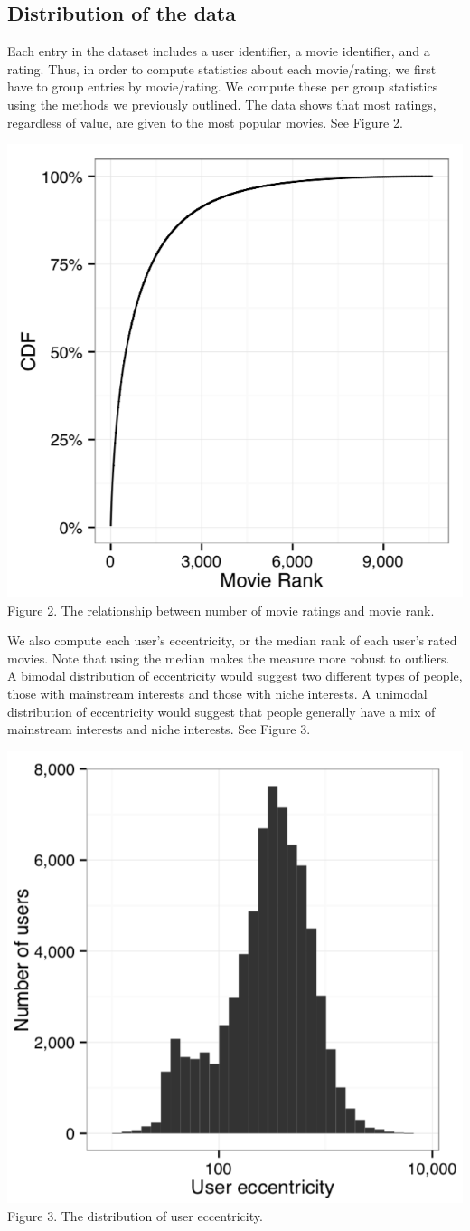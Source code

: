 \subsection{Distribution of the data}
Each entry in the dataset includes a user identifier, a movie identifier, and a rating. Thus, in order to compute statistics about each movie/rating, we first have to group entries by movie/rating. We compute these per group statistics using the methods we previously outlined. The data shows that most ratings, regardless of value, are given to the most popular movies. See Figure 2.
\begin{center}
\includegraphics[width=0.4\linewidth]{figures/cdf.png}\\
Figure 2. The relationship between number of movie ratings and movie rank.
\end{center}
We also compute each user's eccentricity, or the median rank of each user's rated movies. Note that using the median makes the measure more robust to outliers. A bimodal distribution of eccentricity would suggest two different types of people, those with mainstream interests and those with niche interests. A unimodal distribution of eccentricity  would suggest that people generally have a mix of mainstream interests and niche interests. See Figure 3.
\begin{center}
\includegraphics[width=0.4\linewidth]{figures/dist.png}\\
Figure 3. The distribution of user eccentricity.
\end{center}

